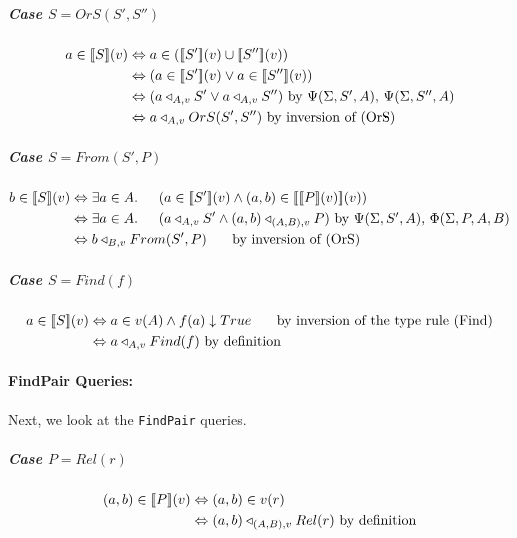 \documentclass[12pt,a4paper,twoside,openright]{report}
\newcommand\codeName[1]{\texttt{#1}}
\newcommand{\db}[1]{{\bf [\![}#1{\bf ]\!]}}
\newcommand{\deno}[1]{\db{#1}(v)}
\newcommand{\denoRule}[2]{#1 \in \deno{#2}}
\newcommand{\opRule}[3]{#1 \triangleleft_{#2, v} #3}
\newcommand{\phiRule}[3]{\Phi(\Sigma, #1, #2, #3)}
\newcommand{\psiRule}[2]{\Psi(\Sigma, #1, #2)}
\begin{document}
\subparagraph{Case $S = OrS(S', S'')$}
\begin{equation} \label{case OrS}
\begin{split}
\denoRule{a}{S} & \Leftrightarrow a \in (\deno{S'} \cup \deno{S''}) \\
				& \Leftrightarrow (\denoRule{a}{S'} \vee \denoRule{a}{S''}) \\
				& \Leftrightarrow (\opRule{a}{A}{S'} \vee \opRule{a}{A}{S''}) \mbox{ by $\psiRule{S'}{A}$, $\psiRule{S''}{A}$}\\
				& \Leftrightarrow \opRule{a}{A}{OrS(S', S'')} \mbox{ by inversion of (OrS)}
\end{split}
\end{equation}

\subparagraph{Case $S = From(S', P)$}
\begin{equation} \label{case From}
\begin{split}
\denoRule{b}{S} & \Leftrightarrow \exists a \in A. \indent (\denoRule{a}{S'} \wedge \denoRule{(a, b)}{\deno{P}}) \\
				& \Leftrightarrow \exists a \in A. \indent (\opRule{a}{A}{S'} \wedge \opRule{(a, b)}{(A, B)}{P}) \mbox{ by $\psiRule{S'}{A}$, $\phiRule{P}{A}{B}$}\\
				& \Leftrightarrow \opRule{b}{B}{From(S', P)} \indent\mbox{ by inversion of (OrS)}
\end{split}
\end{equation}

\subparagraph{Case $S = Find(f)$}
\begin{equation} \label{case Find}
\begin{split}
\denoRule{a}{S} & \Leftrightarrow a \in v(A) \wedge f(a) \downarrow True  \indent \mbox{ by inversion of the type rule (Find)}\\
				& \Leftrightarrow \opRule{a}{A}{Find(f)} \mbox{ by definition}\\
\end{split}
\end{equation}

\paragraph{FindPair Queries:} Next, we look at the \codeName{FindPair} queries.
\\
\subparagraph{Case $P = Rel(r)$}
\begin{equation} \label{case Rel}
\begin{split}
\denoRule{(a, b)}{P} & \Leftrightarrow (a, b) \in v(r)\\
				& \Leftrightarrow \opRule{(a, b)}{(A, B)}{Rel(r)} \mbox{ by definition}\\
\end{split}
\end{equation}
\end{document}
